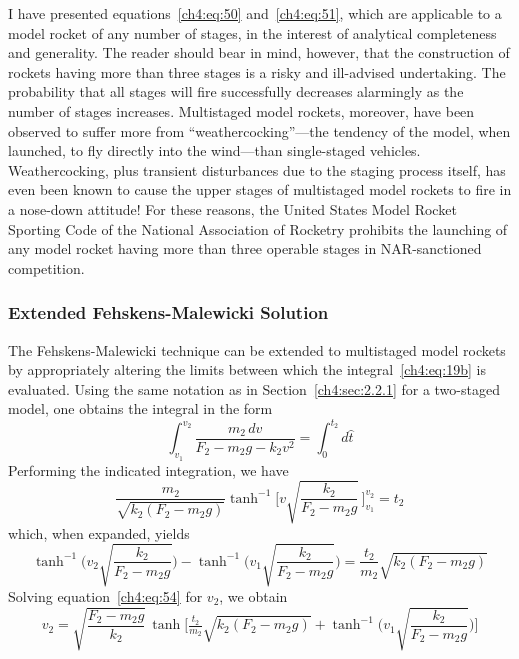 I have presented equations~\eqref{ch4:eq:50} and~\eqref{ch4:eq:51}, which are applicable to a model
rocket of any number of stages, in the interest of analytical completeness and generality. The
reader should bear in mind, however, that the construction of rockets having more than three stages
is a risky and ill-advised undertaking. The probability that all stages will fire successfully
decreases alarmingly as the number of stages increases. Multistaged model rockets, moreover, have
been observed to suffer more from ``weathercocking''---the tendency of the model, when launched, to
fly directly into the wind---than single-staged vehicles. Weathercocking, plus transient
disturbances due to the staging process itself, has even been known to cause the upper stages of
multistaged model rockets to fire in a nose-down attitude! For these reasons, the United States
Model Rocket Sporting Code of the National Association of Rocketry prohibits the launching of any
model rocket having more than three operable stages in NAR-sanctioned competition.

\subsubsection{Extended Fehskens-Malewicki Solution}\label{ch4:sec:2.2.2}

The Fehskens-Malewicki technique can be extended to multistaged model rockets by appropriately
altering the limits between which the integral~\eqref{ch4:eq:19b} is evaluated. Using the same
notation as in Section~\ref{ch4:sec:2.2.1} for a two-staged model, one obtains the integral in the
form
\begin{equation}\label{ch4:eq:52}
\int_{v_1}^{v_2}\frac{m_2\,dv}{F_2 - m_2g - k_2v^{2}} = \int_{0}^{t_2} d\hat{t}
\end{equation}
Performing the indicated integration, we have
\begin{equation}\label{ch4:eq:53}
\frac{m_2}{\sqrt{k_2(F_2 - m_2g)}}\tanh^{-1}\biggl[v\sqrt{\frac{k_2}{F_2 - m_2g}}\,\biggr]_{v_1}^{v_2}
  = t_2
\end{equation}
which, when expanded, yields
\begin{equation}\label{ch4:eq:54}
\tanh^{-1}\biggl(v_2\sqrt{\frac{k_2}{F_2 - m_2g}}\biggr)
  - \tanh^{-1}\biggl(v_1\sqrt{\frac{k_2}{F_2 - m_2g}}\biggr) = \frac{t_2}{m_2}\sqrt{k_2(F_2 - m_2g)}
\end{equation}
Solving equation~\eqref{ch4:eq:54} for $v_2$, we obtain
\begin{equation}\label{ch4:eq:55}
v_2 = \sqrt{\frac{F_2 - m_2g}{k_2}}\,\tanh\biggl[\tfrac{t_2}{m_2}\sqrt{k_2(F_2 - m_2g)}
  + \tanh^{-1}\biggl(v_1\sqrt{\frac{k_2}{F_2 - m_2g}}\biggr)\biggr]
\end{equation}

